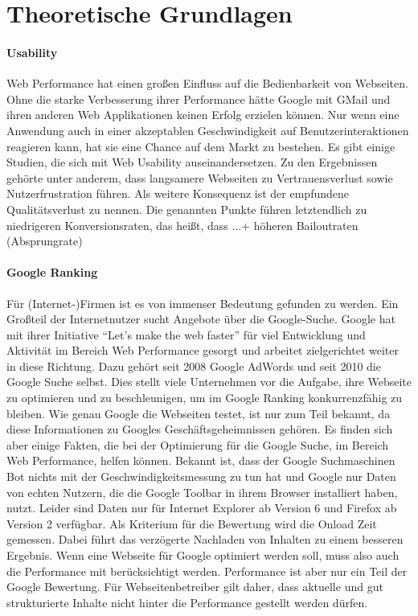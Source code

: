 \part{Theoretische Grundlagen}
\label{sec:theory}

\subsection{Usability}
Web Performance hat einen großen Einfluss auf die Bedienbarkeit von Webseiten. Ohne die starke Verbesserung ihrer Performance hätte Google mit GMail und ihren anderen Web Applikationen keinen Erfolg erzielen können. Nur wenn eine Anwendung auch in einer akzeptablen Geschwindigkeit auf Benutzerinteraktionen reagieren kann, hat sie eine Chance auf dem Markt zu bestehen. Es gibt einige Studien, die sich mit Web Usability auseinandersetzen. Zu den Ergebnissen gehörte unter anderem, dass langsamere Webseiten zu Vertrauensverlust sowie Nutzerfrustration führen. Als weitere Konsequenz ist der empfundene Qualitätsverlust zu nennen. Die genannten Punkte führen letztendlich zu niedrigeren Konversionsraten, das heißt, dass ...+ höheren Bailoutraten (Absprungrate)


\subsection{Google Ranking}
Für (Internet-)Firmen ist es von immenser Bedeutung gefunden zu werden. Ein Großteil der Internetnutzer sucht Angebote über die Google-Suche. Google hat mit ihrer Initiative ``Let's make the web faster'' für viel Entwicklung und Aktivität im Bereich Web Performance gesorgt und arbeitet zielgerichtet weiter in diese Richtung. Dazu gehört seit  2008 Google AdWords und seit 2010 die Google Suche selbst. Dies stellt viele Unternehmen vor die Aufgabe, ihre Webseite zu optimieren und zu beschleunigen, um im Google Ranking konkurrenzfähig zu bleiben. Wie genau Google die Webseiten testet, ist nur zum Teil bekannt, da diese Informationen zu Googles Geschäftsgeheimnissen gehören. Es finden sich aber einige Fakten, die bei der Optimierung für die Google Suche, im Bereich Web Performance, helfen können.
Bekannt ist, dass der Google Suchmaschinen Bot nichts mit der Geschwindigkeitsmessung zu tun hat und Google nur Daten von echten Nutzern, die die Google Toolbar in ihrem Browser installiert haben, nutzt. Leider sind Daten nur für Internet Explorer ab Version 6 und Firefox ab Version 2 verfügbar. Als Kriterium für die Bewertung wird die Onload Zeit gemessen. Dabei führt das verzögerte Nachladen von Inhalten zu einem besseren Ergebnis. Wenn eine Webseite für Google optimiert werden soll, muss also auch die Performance mit berücksichtigt werden. Performance ist aber nur ein Teil der Google Bewertung. Für Webseitenbetreiber gilt daher, dass aktuelle und gut strukturierte Inhalte nicht hinter die Performance gestellt werden dürfen.

